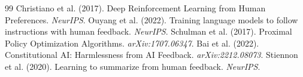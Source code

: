 \documentclass[11pt,a4paper]{article}
\begin{document}

\begin{thebibliography}{99}
 Christiano et al. (2017). Deep Reinforcement Learning from Human Preferences. \textit{NeurIPS}.
 Ouyang et al. (2022). Training language models to follow instructions with human feedback. \textit{NeurIPS}.
 Schulman et al. (2017). Proximal Policy Optimization Algorithms. \textit{arXiv:1707.06347}.
 Bai et al. (2022). Constitutional AI: Harmlessness from AI Feedback. \textit{arXiv:2212.08073}.
 Stiennon et al. (2020). Learning to summarize from human feedback. \textit{NeurIPS}.
\end{thebibliography}
\end{document}
